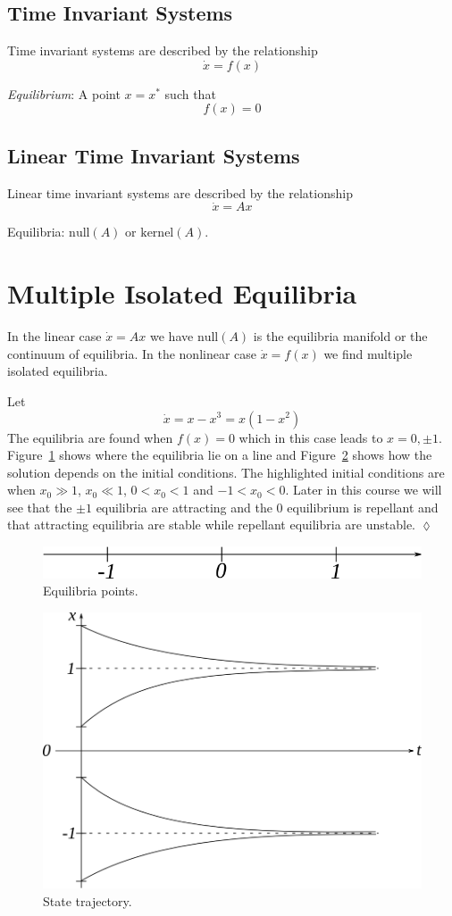 \subsection{Time Invariant Systems}
Time invariant systems are described by the relationship
$$\dot{x}=f(x)$$
\begin{definition}
\textit{Equilibrium}: A point $x=x^\ast$ such that
$$f(x) = 0$$
\end{definition}

\subsection{Linear Time Invariant Systems}
Linear time invariant systems are described by the relationship
$$\dot{x}=Ax$$
\begin{definition}
Equilibria: $\text{null}(A)$ or $\text{kernel}(A)$.
\end{definition}

\section{Multiple Isolated Equilibria}
In the linear case $\dot{x}=Ax$ we have $\text{null}(A)$ is the equilibria manifold or the continuum of equilibria.
In the nonlinear case $\dot{x}=f(x)$ we find multiple isolated equilibria.
\begin{example}
Let
$$\dot{x} = x-x^3 = x(1-x^2)$$
The equilibria are found when $f(x)=0$ which in this case leads to $x=0,\pm1$.
Figure~\ref{fig:01roots} shows where the equilibria lie on a line and Figure~\ref{fig:01traj} shows how the solution depends on the initial conditions.
The highlighted initial conditions are when $x_0\gg1$, $x_0\ll1$, $0<x_0<1$ and $-1<x_0<0$.
Later in this course we will see that the $\pm1$ equilibria are attracting and the $0$ equilibrium is repellant and that attracting equilibria are stable while repellant equilibria are unstable.
$\lozenge$
\end{example}

\begin{figure}[ht!]
\centering
\includegraphics[width=.4\textwidth]{images/01roots}
\caption{Equilibria points.}
\label{fig:01roots}
\end{figure}

\begin{figure}[ht!]
\centering
\includegraphics[width=.4\textwidth]{images/01traj}
\caption{State trajectory.}
\label{fig:01traj}
\end{figure}

